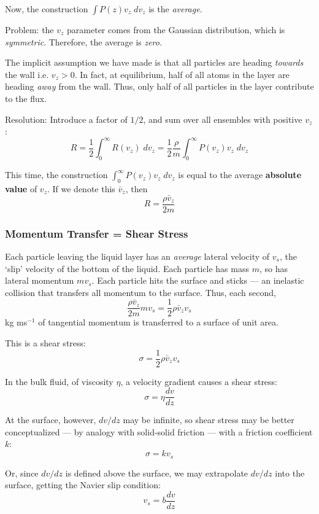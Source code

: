 \documentclass{paper}
\begin{document}
Now, the construction $\int P(z) v_{z} \; dv_{z}$ is the \emph{average}.

Problem: the $v_{z}$ parameter comes from the Gaussian distribution, which is \emph{symmetric}.  Therefore, the average is \emph{zero.}

The implicit assumption we have made is that all particles are heading \emph{towards} the wall i.e. $v_{z}>0$. In fact, at equilibrium, half of all atoms in the layer are heading \emph{away} from the wall.  Thus, only half of all particles in the layer contribute to the flux.

Resolution: Introduce a factor of $1/2$, and sum over all ensembles with positive $v_{z}$:
\[ R = \frac{1}{2}\int_{0}^{\infty} R(v_{z})\; dv_{z} = 
 \frac{1}{2} \frac{\rho}{m} \int_{0}^{\infty} P(v_{z}) v_{z} \;dv_{z} \]

This time, the construction $ \int_{0}^{\infty} P(v_{z}) v_{z} \;dv_{z} $ is equal to the average \textbf{absolute value} of $v_{z}$. If we denote this $\bar{v}_{z}$, then
\[ R = \frac{\rho \bar{v}_{z}}{2 m} \]

\subsubsection*{Momentum Transfer = Shear Stress}

Each particle leaving the liquid layer has an \emph{average} lateral velocity of $v_{s}$, the `slip' velocity of the bottom of the liquid. Each particle has mass $m$, so has lateral momentum $mv_{s}$.  Each particle hits the surface and sticks --- an inelastic collision that transfers all momentum to the surface.  Thus, each second, 
\[ \frac{\rho \bar{v}_{z}}{2 m} mv_{s} = \frac{1}{2} \rho \bar{v}_{z} v_{s} \]
kg ms$^{-1}$ of tangential momentum is transferred to a surface of unit area.

This is a shear stress:
\[ \sigma = \frac{1}{2} \rho \bar{v}_{z} v_{s} \]

In the bulk fluid, of viscosity $\eta$, a velocity gradient causes a shear stress:
\[ \sigma = \eta \frac{dv}{dz} \]

At the surface, however, $dv/dz$ may be infinite, so shear stress may be better conceptualized --- by analogy with solid-solid friction --- with a friction coefficient $k$:
\[ \sigma = k v_{s} \]

Or, since $dv/dz$ is defined above the surface, we may extrapolate $dv/dz$ into the surface, getting the Navier slip condition:
\[ v_{s} = b \frac{dv}{dz} \]
\end{document}
